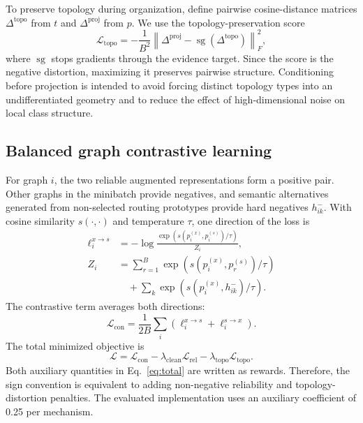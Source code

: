\documentclass[10pt,twocolumn]{article}
\newcommand{\norm}[1]{\left\lVert #1\right\rVert}
\begin{document}
To preserve topology during organization, define pairwise cosine-distance matrices $\Delta^{\mathrm{topo}}$ from $t$ and $\Delta^{\mathrm{proj}}$ from $p$. We use the topology-preservation score
\begin{equation}
\label{eq:toporeward}
\mathcal L_{\mathrm{topo}}=-\frac{1}{B^2}
\norm{\Delta^{\mathrm{proj}}-\operatorname{sg}(\Delta^{\mathrm{topo}})}_F^2,
\end{equation}
where $\operatorname{sg}$ stops gradients through the evidence target. Since the score is the negative distortion, maximizing it preserves pairwise structure. Conditioning before projection is intended to avoid forcing distinct topology types into an undifferentiated geometry and to reduce the effect of high-dimensional noise on local class structure.

\subsection{Balanced graph contrastive learning}

For graph $i$, the two reliable augmented representations form a positive pair. Other graphs in the minibatch provide negatives, and semantic alternatives generated from non-selected routing prototypes provide hard negatives $h_{ik}^-$. With cosine similarity $s(\cdot,\cdot)$ and temperature $\tau$, one direction of the loss is
\begin{equation}
\begin{aligned}
\ell_i^{x\rightarrow s}
&=-\log\frac{\exp(s(p_i^{(x)},p_i^{(s)})/\tau)}{Z_i},\\
Z_i&=\sum_{r=1}^{B}\exp(s(p_i^{(x)},p_r^{(s)})/\tau)\\[-2pt]
&\quad+\sum_k\exp(s(p_i^{(x)},h_{ik}^-)/\tau).
\end{aligned}
\end{equation}
The contrastive term averages both directions:
\begin{equation}
\mathcal L_{\mathrm{con}}=\frac{1}{2B}\sum_i
(\ell_i^{x\rightarrow s}+\ell_i^{s\rightarrow x}).
\end{equation}
The total minimized objective is
\begin{equation}
\label{eq:total}
\boxed{\mathcal L=
\mathcal L_{\mathrm{con}}
-\lambda_{\mathrm{clean}}\mathcal L_{\mathrm{rel}}
-\lambda_{\mathrm{topo}}\mathcal L_{\mathrm{topo}}.}
\end{equation}
Both auxiliary quantities in Eq.~\eqref{eq:total} are written as rewards. Therefore, the sign convention is equivalent to adding non-negative reliability and topology-distortion penalties. The evaluated implementation uses an auxiliary coefficient of 0.25 per mechanism.
\end{document}
